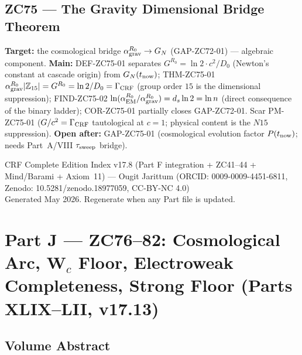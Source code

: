 \documentclass[11pt, a4paper]{article}
\newcommand{\Ztf}{\mathbb{Z}_{15}}
\begin{document}
\subsection{ZC75 --- The Gravity Dimensional Bridge Theorem}

\begin{zcbox}[title={ZC75: THM-ZC75-01 --- Gravity Dimensional Bridge (Exact at $R_0$)}]
\sloppy
\textbf{Target:} the cosmological bridge $\alpha_{\rm grav}^{R_0}\to G_N$
(GAP-ZC72-01) --- algebraic component. \textbf{Main:} DEF-ZC75-01 separates
$G^{R_0}=\ln 2\cdot c^2/D_0$ (Newton's constant at cascade origin) from
$G_N(t_{\rm now})$; THM-ZC75-01 $\alpha_{\rm grav}^{R_0}|\Ztf|=G^{R_0}
=\ln 2/D_0=\Gamma_{\rm CRF}$ (group order $15$ is the dimensional
suppression); FIND-ZC75-02 $\ln(\alpha_{\rm EM}^{R_0}/\alpha_{\rm grav}^{R_0})
=d_s\ln 2=\ln n$ (direct consequence of the binary ladder);
COR-ZC75-01 partially closes GAP-ZC72-01. Scar PM-ZC75-01 ($G/c^2=\Gamma_{\rm CRF}$
tautological at $c=1$; physical content is the $N15$ suppression).
\textbf{Open after:} GAP-ZC75-01 (cosmological evolution factor
$P(t_{\rm now})$; needs Part~A/VIII $\tau_{\rm sweep}$ bridge).
\end{zcbox}

\newpage

\begin{center}
\small\color{mutedgray}
CRF Complete Edition Index v17.8 (Part F integration + ZC41--44 + Mind/Barami + Axiom~11) ---
Ougit Jarittum (ORCID: 0009-0009-4451-6811, Zenodo: 10.5281/zenodo.18977059, CC-BY-NC 4.0)\\
Generated May 2026. Regenerate when any Part file is updated.
\end{center}

\newpage


\vfill


\section{Part J --- ZC76--82: Cosmological Arc, W$_c$ Floor,
  Electroweak Completeness, Strong Floor (Parts XLIX--LII, v17.13)}

\subsection*{Volume Abstract}
\end{document}
